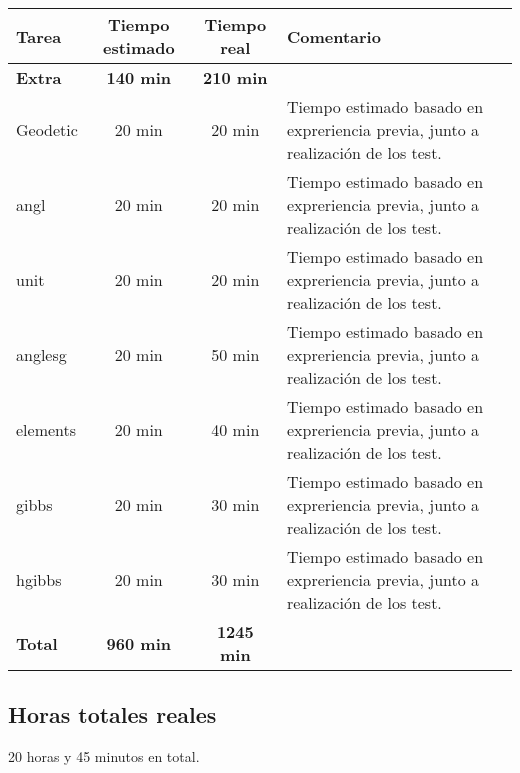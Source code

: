 \documentclass[12pt,a4paper]{article}
\begin{document}
\begin{center}
    \begin{tabular}{|p{3cm}|c|c|p{6cm}|}
        \hline
        \textbf{Tarea} & \textbf{Tiempo estimado} & \textbf{Tiempo real} & \textbf{Comentario} \\
        \hline
        \textbf{Extra} & \textbf{140 min} & \textbf{210 min} & \\
        \hline
        Geodetic & 20 min & 20 min & Tiempo estimado basado en expreriencia previa, junto a realización de los test.\\
        \hline
        angl & 20 min & 20 min & Tiempo estimado basado en expreriencia previa, junto a realización de los test.\\
        \hline
        unit & 20 min & 20 min & Tiempo estimado basado en expreriencia previa, junto a realización de los test.\\
        \hline
        anglesg & 20 min & 50 min & Tiempo estimado basado en expreriencia previa, junto a realización de los test.\\
        \hline
        elements & 20 min & 40 min & Tiempo estimado basado en expreriencia previa, junto a realización de los test.\\
        \hline
        gibbs & 20 min & 30 min & Tiempo estimado basado en expreriencia previa, junto a realización de los test.\\
        \hline
        hgibbs & 20 min & 30 min & Tiempo estimado basado en expreriencia previa, junto a realización de los test.\\
        \hline
        \textbf{Total} & \textbf{960 min} & \textbf{1245 min} & \\
        \hline
    \end{tabular}
\end{center}

\subsection{Horas totales reales}
20 horas y 45 minutos en total.


%  
%  
\end{document}
